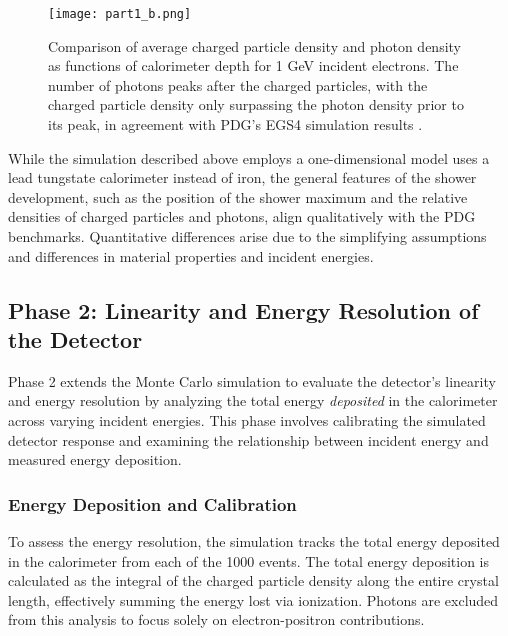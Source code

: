 \documentclass[twocolumn]{aastex631}
\begin{document}
\begin{figure}[htp]
  \centering
    \texttt{[image: part1\_b.png]}
    \caption{Comparison of average charged particle density and photon density
        as functions of calorimeter depth for 1 GeV incident electrons. The
        number of photons peaks after the charged particles, with the charged particle
        density only surpassing the photon density prior to its peak, in agreement
    with PDG’s EGS4 simulation results \citep{Groom2019ParticlePassage}.}
    \label{fig:1b}
\end{figure}

While the simulation described above employs a one-dimensional model uses a lead
tungstate calorimeter instead of iron,
the general features of the shower development, such as the position of the
shower maximum and the relative densities of charged particles and photons, 
align qualitatively with the PDG benchmarks. Quantitative
differences arise due to the simplifying assumptions and differences in material
properties and incident energies. 

\subsection{Phase 2: Linearity and Energy Resolution of the Detector} 

Phase 2 extends the Monte Carlo simulation to evaluate the detector's linearity
and energy resolution by analyzing the total energy \textit{deposited} in the
calorimeter across varying incident energies. This phase involves calibrating
the simulated detector response and examining the relationship between incident
energy and measured energy deposition. 

\subsubsection{Energy Deposition and Calibration} 

To assess the energy resolution, the simulation tracks the total energy
deposited in the calorimeter from each of the 1000 events. The total energy
deposition is calculated as the integral of the charged particle density along
the entire crystal length, effectively summing the energy lost via ionization.
Photons are excluded from this analysis to focus solely on electron-positron
contributions. 
\end{document}
